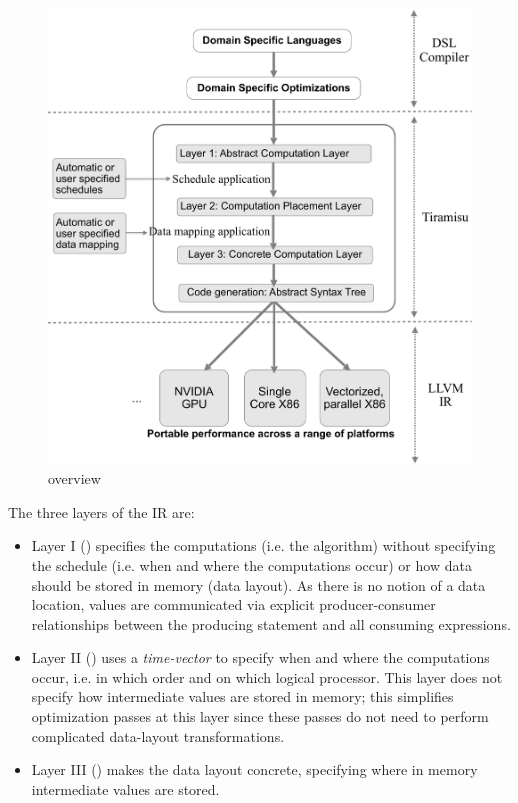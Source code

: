 \begin{figure}
 \includegraphics[scale=0.35]{./figures/fista.pdf}
 \caption{\framework overview}
 \label{fig:overview}
\end{figure}

The three layers of the \framework IR are: 
\begin{itemize}
  \item Layer I (\Layerone) specifies the computations (i.e. the algorithm) without specifying the schedule (i.e. when and where the computations occur) or how data should be stored in memory (data layout). As there is no notion of a data location, values are communicated via explicit producer-consumer relationships between the producing statement and all consuming expressions.  
  \item Layer II (\Layertwo) uses a {\it time-\processor vector} to specify when and where the computations occur, i.e. in which order and on which logical processor. This layer does not specify how intermediate values are stored in memory; this simplifies optimization passes at this layer since these passes do not need to perform complicated data-layout transformations. 
  \item Layer III (\Layerthree) makes the data layout concrete, specifying where in memory intermediate values are stored.
\end{itemize}

